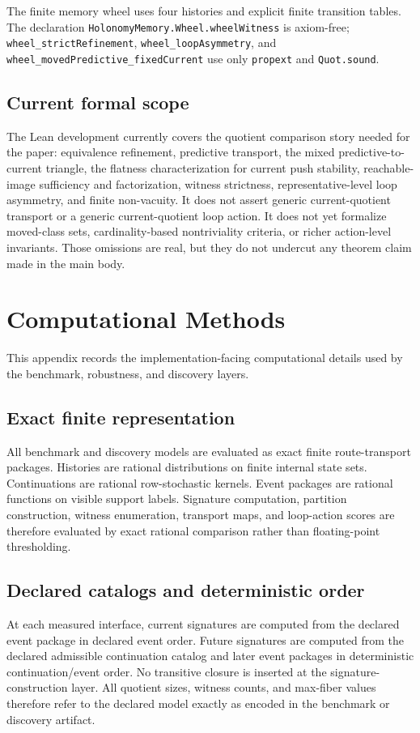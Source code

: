 \documentclass[11pt]{article}
\theoremstyle{definition}
\begin{document}
The finite memory wheel uses four histories and explicit finite transition tables. The declaration \nolinkurl{HolonomyMemory.Wheel.wheelWitness} is axiom-free; \nolinkurl{wheel_strictRefinement}, \nolinkurl{wheel_loopAsymmetry}, and \nolinkurl{wheel_movedPredictive_fixedCurrent} use only \nolinkurl{propext} and \nolinkurl{Quot.sound}.

\subsection{Current formal scope}\label{appsubsec:lean-scope}
The Lean development currently covers the quotient comparison story needed for the paper: equivalence refinement, predictive transport, the mixed predictive-to-current triangle, the flatness characterization for current push stability, reachable-image sufficiency and factorization, witness strictness, representative-level loop asymmetry, and finite non-vacuity. It does not assert generic current-quotient transport or a generic current-quotient loop action. It does not yet formalize moved-class sets, cardinality-based nontriviality criteria, or richer action-level invariants. Those omissions are real, but they do not undercut any theorem claim made in the main body.

\section{Computational Methods}\label{app:computational-methods}
This appendix records the implementation-facing computational details used by the benchmark, robustness, and discovery layers.

\subsection{Exact finite representation}\label{appsubsec:comp-exact}
All benchmark and discovery models are evaluated as exact finite route-transport packages. Histories are rational distributions on finite internal state sets. Continuations are rational row-stochastic kernels. Event packages are rational functions on visible support labels. Signature computation, partition construction, witness enumeration, transport maps, and loop-action scores are therefore evaluated by exact rational comparison rather than floating-point thresholding.

\subsection{Declared catalogs and deterministic order}\label{appsubsec:comp-order}
At each measured interface, current signatures are computed from the declared event package in declared event order. Future signatures are computed from the declared admissible continuation catalog and later event packages in deterministic continuation/event order. No transitive closure is inserted at the signature-construction layer. All quotient sizes, witness counts, and max-fiber values therefore refer to the declared model exactly as encoded in the benchmark or discovery artifact.
\end{document}

